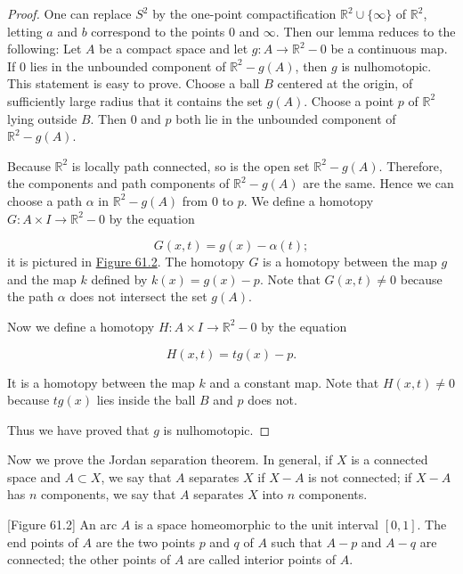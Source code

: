 \begin{proof}
One can replace \(S^{2}\) by the one-point compactification \(\mathbb{R}^{2} \cup \{ \infty \}\) of \(\mathbb{R}^{2}\), letting \(a\) and \(b\) correspond to the points 0 and \(\infty\). Then our lemma reduces to the following: Let \(A\) be a compact space and let \(g : A \rightarrow {\mathbb{R}}^{2} - 0\) be a continuous map. If 0 lies in the unbounded component of \(\mathbb{R}^{2} - g( A)\), then \(g\) is nulhomotopic.
This statement is easy to prove. Choose a ball \(B\) centered at the origin, of sufficiently large radius that it contains the set \(g( A)\). Choose a point \(p\) of \(\mathbb{R}^{2}\) lying outside \(B\). Then 0 and \(p\) both lie in the unbounded component of \(\mathbb{R}^{2} - g( A)\).

Because \(\mathbb{R}^{2}\) is locally path connected, so is the open set \(\mathbb{R}^{2} - g( A)\). Therefore, the components and path components of \(\mathbb{R}^{2} - g( A)\) are the same. Hence we can choose a path \(\alpha\) in \(\mathbb{R}^{2} - g( A)\) from 0 to \(p\). We define a homotopy \(G : A \times I \rightarrow {\mathbb{R}}^{2} - 0\) by the equation

\[
G( {x,t}) = g(x) - \alpha ( t) ;
\]
it is pictured in \hyperref[fig:61.2]{Figure 61.2}. The homotopy \(G\) is a homotopy between the map \(g\) and the map \(k\) defined by \(k(x) = g(x) - p\). Note that \(G( {x,t}) \neq 0\) because the path \(\alpha\) does not intersect the set \(g( A)\).

Now we define a homotopy \(H : A \times I \rightarrow {\mathbb{R}}^{2} - 0\) by the equation

\[
H( {x,t}) = {tg}(x) - p.
\]

It is a homotopy between the map \(k\) and a constant map. Note that \(H( {x,t}) \neq 0\) because \({tg}(x)\) lies inside the ball \(B\) and \(p\) does not.

Thus we have proved that \(g\) is nulhomotopic.
\end{proof}

Now we prove the Jordan separation theorem. In general, if \(X\) is a connected space and \(A \subset X\), we say that \(A\) separates \(X\) if \(X - A\) is not connected; if \(X - A\) has \(n\) components, we say that \(A\) separates \(X\) into \(n\) components.

[Figure 61.2]
An arc \(A\) is a space homeomorphic to the unit interval \([ {0,1}]\). The end points of \(A\) are the two points \(p\) and \(q\) of \(A\) such that \(A - p\) and \(A - q\) are connected; the other points of \(A\) are called interior points of \(A\).

